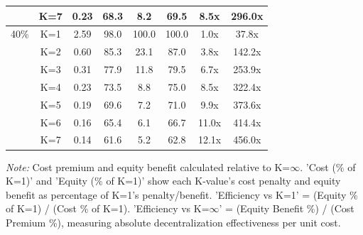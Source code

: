 \documentclass[preprint,12pt,nopreprintline]{elsarticle}
\begin{document}
\begin{table}[htbp]
{\begin{tabular}{cccccccc}
 & K=7 & 0.23 & 68.3 & 8.2 & 69.5 & 8.5x & 296.0x \\
\midrule
40\% & K=1 & 2.59 & 98.0 & 100.0 & 100.0 & 1.0x & 37.8x \\
 & K=2 & 0.60 & 85.3 & 23.1 & 87.0 & 3.8x & 142.2x \\
 & K=3 & 0.31 & 77.9 & 11.8 & 79.5 & 6.7x & 253.9x \\
 & K=4 & 0.23 & 73.5 & 8.8 & 75.0 & 8.5x & 322.4x \\
 & K=5 & 0.19 & 69.6 & 7.2 & 71.0 & 9.9x & 373.6x \\
 & K=6 & 0.16 & 65.4 & 6.1 & 66.7 & 11.0x & 414.4x \\
 & K=7 & 0.14 & 61.6 & 5.2 & 62.8 & 12.1x & 456.0x \\
\bottomrule
\end{tabular}}
\begin{tablenotes}
\small
\item \textit{Note:} Cost premium and equity benefit calculated relative to K=$\infty$. 
'Cost (\% of K=1)' and 'Equity (\% of K=1)' show each K-value's cost penalty and equity benefit as percentage of K=1's penalty/benefit. 
'Efficiency vs K=1' = (Equity \% of K=1) / (Cost \% of K=1). 
'Efficiency vs K=$\infty$' = (Equity Benefit \%) / (Cost Premium \%), measuring absolute decentralization effectiveness per unit cost.
\end{tablenotes}
\end{table}
\end{document}
